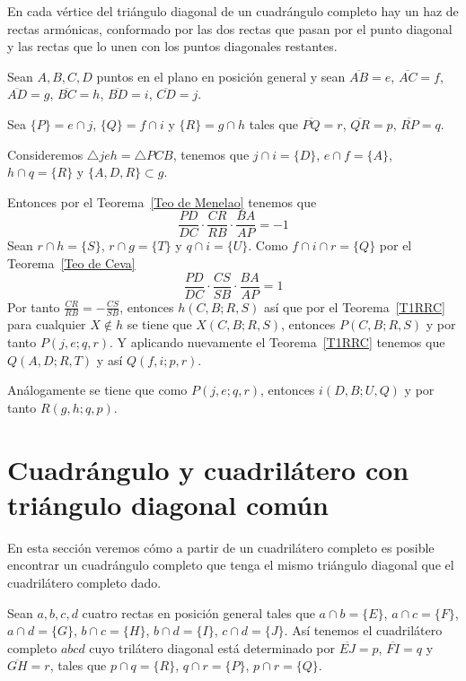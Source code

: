 \begin{teo}
En cada vértice del triángulo diagonal de un cuadrángulo completo hay un haz de rectas armónicas, conformado por las dos rectas que pasan por el punto diagonal y las rectas que lo unen con los puntos diagonales restantes. 
\end{teo}
\begin{dem}
Sean $A,B,C,D$ puntos en el plano en posición general y sean $\overline{AB}=e$, $\overline{AC}=f$, $\overline{AD}=g$, $\overline{BC}=h$, $\overline{BD}=i$, $\overline{CD}=j$. 

Sea $\{P\}=e\cap j$, $\{Q\}=f\cap i$ y $\{R\}=g\cap h$ tales que $\overline{PQ}=r$, $\overline{QR}=p$, $\overline{RP}=q$. 

Consideremos $\triangle jeh=\triangle PCB$, tenemos que $j\cap i=\{D\}$, $e\cap f=\{A\}$, $h\cap q=\{R\}$ y $\{A,D,R\}\subset g$. 

Entonces por el Teorema~\ref{Teo de Menelao} tenemos que 
$$\frac{PD}{DC}\cdot\frac{CR}{RB}\cdot\frac{BA}{AP}=-1$$
Sean $r\cap h=\{S\}$, $r\cap g=\{T\}$ y $q\cap i=\{U\}$. Como $f\cap i\cap r=\{Q\}$ por el Teorema~\ref{Teo de Ceva}
$$\frac{PD}{DC}\cdot\frac{CS}{SB}\cdot\frac{BA}{AP}=1$$
Por tanto $\frac{CR}{RB}=-\frac{CS}{SB}$, entonces $h(C,B;R,S)$ así que por el Teorema~\ref{T1RRC} para cualquier $X\notin h$ se tiene que $X(C,B;R,S)$, entonces $P(C,B;R,S)$ y por tanto $P(j,e;q,r)$. Y aplicando nuevamente el Teorema~\ref{T1RRC} tenemos que $Q(A,D;R,T)$ y así $Q(f,i;p,r)$.

Análogamente se tiene que como $P(j,e;q,r)$, entonces $i(D,B;U,Q)$ y por tanto $R(g,h;q,p)$.

\end{dem}

\section{Cuadrángulo y cuadrilátero con triángulo diagonal común}
En esta sección veremos cómo a partir de un cuadrilátero completo es posible encontrar un cuadrángulo completo que tenga el mismo triángulo diagonal que el cuadrilátero completo dado.

Sean $a,b,c,d$ cuatro rectas en posición general tales que $a\cap b=\{E\}$, $a\cap c=\{F\}$, $a\cap d=\{G\}$, $b\cap c=\{H\}$, $b\cap d=\{I\}$, $c\cap d=\{J\}$. Así tenemos el cuadrilátero completo $abcd$ cuyo trilátero diagonal está determinado por $\overline{EJ}=p$, $\overline{FI}=q$ y $\overline{GH}=r$, tales que $p\cap q=\{R\}$, $q\cap r=\{P\}$, $p\cap r=\{Q\}$.

